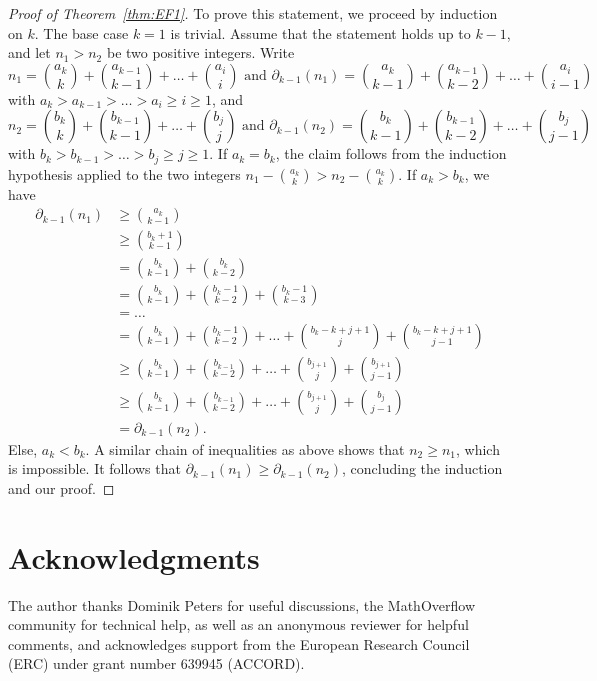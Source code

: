 \documentclass[11pt]{scrartcl}
\theoremstyle{definition}
\begin{document}
\begin{proof}[Proof of Theorem~\ref{thm:EF1}]
To prove this statement, we proceed by induction on $k$.
The base case $k=1$ is trivial.
Assume that the statement holds up to $k-1$, and let $n_1> n_2$ be two positive integers.
Write
$$
n_1 = \binom{a_k}{k} + \binom{a_{k-1}}{k-1}+\dots+\binom{a_i}{i}\text{ and }
\partial_{k-1}(n_1) = \binom{a_k}{k-1} + \binom{a_{k-1}}{k-2}+\dots+\binom{a_i}{i-1}
$$
with $a_k>a_{k-1}>\dots>a_i\geq i\geq 1$, and
$$
n_2 = \binom{b_k}{k} + \binom{b_{k-1}}{k-1}+\dots+\binom{b_j}{j}\text{ and }
\partial_{k-1}(n_2) = \binom{b_k}{k-1} + \binom{b_{k-1}}{k-2}+\dots+\binom{b_j}{j-1}
$$
with $b_k>b_{k-1}>\dots>b_j\geq j\geq 1$.
If $a_k = b_k$, the claim follows from the induction hypothesis applied to the two integers $n_1-\binom{a_k}{k} > n_2-\binom{a_k}{k}$.
If $a_k > b_k$, we have
\begin{align*}
\partial_{k-1}(n_1)
&\geq
\binom{a_k}{k-1} \\
&\geq \binom{b_k+1}{k-1} \\
&= \binom{b_k}{k-1} + \binom{b_k}{k-2} \\
&= \binom{b_k}{k-1} + \binom{b_k-1}{k-2} + \binom{b_k-1}{k-3} \\
&= \dots \\
&= \binom{b_k}{k-1} + \binom{b_k-1}{k-2} +\dots + \binom{b_k-k+j+1}{j} + \binom{b_k-k+j+1}{j-1} \\
&\geq \binom{b_k}{k-1} + \binom{b_{k-1}}{k-2} +\dots + \binom{b_{j+1}}{j} + \binom{b_{j+1}}{j-1} \\
&\geq \binom{b_k}{k-1} + \binom{b_{k-1}}{k-2} +\dots + \binom{b_{j+1}}{j} + \binom{b_j}{j-1} \\
&= \partial_{k-1}(n_2).
\end{align*}
Else, $a_k<b_k$. A similar chain of inequalities as above shows that $n_2\geq n_1$, which is impossible.
It follows that $\partial_{k-1}(n_1) \geq \partial_{k-1}(n_2)$, concluding the induction and our proof.
\end{proof}


\section*{Acknowledgments}
The author thanks Dominik Peters for useful discussions, the MathOverflow community for technical help, as well as an anonymous reviewer for helpful comments, and acknowledges support from the European Research Council (ERC) under grant number 639945 (ACCORD).













\end{document}
